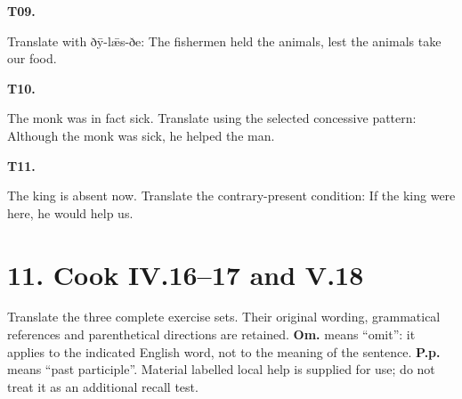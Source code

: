 \par\begin{minipage}{\linewidth}\raggedright
\textbf{T09.}

Translate with ðȳ-lǣs-ðe: The fishermen held the animals, lest the animals take our food.

\end{minipage}\par\addvspace{4pt}

\par\begin{minipage}{\linewidth}\raggedright
\textbf{T10.}

The monk was in fact sick. Translate using the selected concessive pattern: Although the monk was sick, he helped the man.

\end{minipage}\par\addvspace{4pt}

\par\begin{minipage}{\linewidth}\raggedright
\textbf{T11.}

The king is absent now. Translate the contrary-present condition: If the king were here, he would help us.

\end{minipage}\par\addvspace{4pt}

\section*{11. Cook IV.16–17 and V.18}

Translate the three complete exercise sets. Their original wording, grammatical references and parenthetical directions are retained. \textbf{Om.} means “omit”: it applies to the indicated English word, not to the meaning of the sentence. \textbf{P.p.} means “past participle”. Material labelled local help is supplied for use; do not treat it as an additional recall test.

